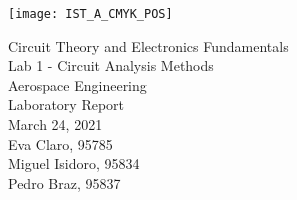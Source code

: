 
\thispagestyle {empty}

\texttt{[image: IST\_A\_CMYK\_POS]}

\begin{center}
%
\vspace{1.0cm}

\vspace{1cm}
{\FontLb Circuit Theory and Electronics Fundamentals} \\ %
\vspace{1cm}
{\FontLb Lab 1 - Circuit Analysis Methods} \\ %
\vspace{1cm}
{\FontLb Aerospace Engineering} \\ %
\vspace{4cm}
{\FontSn Laboratory Report} \\
\vspace{0.5cm}
{\FontSn March 24, 2021} \\ %
\vspace{7cm}
{\FontSn Eva Claro, 95785} \\
\vspace{0.5cm}
{\FontSn Miguel Isidoro, 95834} \\
\vspace{0.5cm}
{\FontSn Pedro Braz, 95837} \\
\newpage
%
\end{center}
